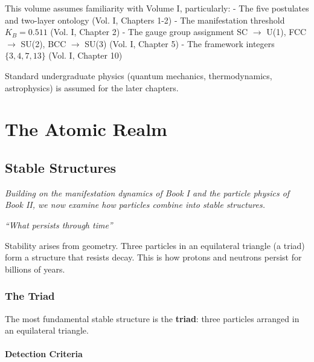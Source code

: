 \documentclass[
  11pt,
  letterpaper,
  twoside,
  openright]{book}
\begin{document}
This volume assumes familiarity with Volume I, particularly: - The five
postulates and two-layer ontology (Vol. I, Chapters 1-2) - The
manifestation threshold \(K_B = 0.511\) (Vol. I, Chapter 2) - The gauge
group assignment SC \(\to\) U(1), FCC \(\to\) SU(2), BCC \(\to\) SU(3)
(Vol. I, Chapter 5) - The framework integers \(\{3, 4, 7, 13\}\) (Vol.
I, Chapter 10)

Standard undergraduate physics (quantum mechanics, thermodynamics,
astrophysics) is assumed for the later chapters.

\part{The Atomic Realm}

\chapter{Stable Structures}\label{sec-stable-structures}

\emph{Building on the manifestation dynamics of Book I and the particle
physics of Book II, we now examine how particles combine into stable
structures.}

\emph{``What persists through time''}

\begin{tcolorbox}[enhanced jigsaw, leftrule=.75mm, title=\textcolor{quarto-callout-note-color}{\faInfo}\hspace{0.5em}{Key Revelation}, bottomrule=.15mm, opacityback=0, coltitle=black, arc=.35mm, colframe=quarto-callout-note-color-frame, colbacktitle=quarto-callout-note-color!10!white, colback=white, titlerule=0mm, breakable, bottomtitle=1mm, toptitle=1mm, rightrule=.15mm, toprule=.15mm, left=2mm, opacitybacktitle=0.6]

Stability arises from geometry. Three particles in an equilateral
triangle (a triad) form a structure that resists decay. This is how
protons and neutrons persist for billions of years.

\end{tcolorbox}

\section{The Triad}\label{the-triad}

The most fundamental stable structure is the \textbf{triad}: three
particles arranged in an equilateral triangle.

\subsection{Detection Criteria}\label{detection-criteria}
\end{document}
